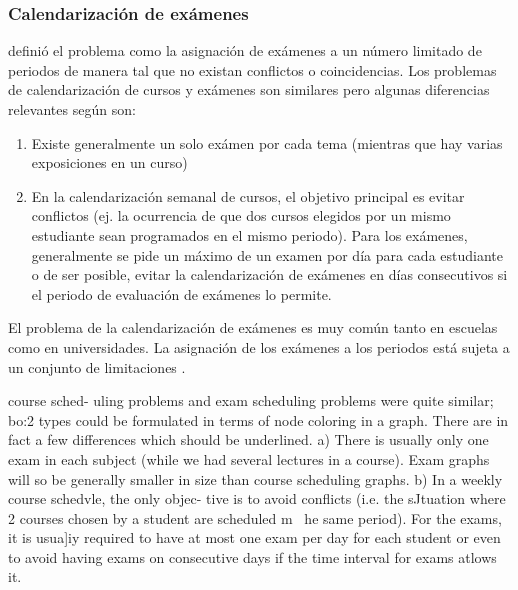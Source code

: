 \documentclass[draft,12pt,headsepline,footsepline,paper=letter]{scrreprt}
\begin{document}

\subsubsection{Calendarización de exámenes}

\citet[p.~4]{carter95recent-developments} definió el problema como la asignación de exámenes a un número limitado de periodos de manera tal que no existan conflictos o coincidencias. Los problemas de calendarización de cursos y exámenes son similares pero algunas diferencias relevantes según \citet[p.~159]{werra85an-introduction-to-timetabling} son:
\begin{enumerate}[a]
\item Existe generalmente un solo exámen por cada tema (mientras que hay varias exposiciones en un curso)
\item En la calendarización semanal de cursos, el objetivo principal es evitar conflictos (ej. la ocurrencia de que dos cursos elegidos por un mismo estudiante sean programados en el mismo periodo). Para los exámenes, generalmente se pide un máximo de un examen por día para cada estudiante o de ser posible, evitar la calendarización de exámenes en días consecutivos si el periodo de evaluación de exámenes lo permite.
\end{enumerate}
El problema de la calendarización de exámenes es muy común tanto en escuelas como en universidades. La asignación de los exámenes a los periodos está sujeta a un conjunto de limitaciones \citep[p.~12]{abdullah06heuristic-approaches}.

\iffalse
course sched- uling problems and exam scheduling problems were quite similar; bo:2 types could be formulated in terms of node coloring in a graph. There are in fact a few differences which should be underlined.
a) There is usually only one exam in each subject (while we had several lectures in a course). Exam graphs will so be generally smaller in size than course scheduling graphs.
b) In a weekly course schedvle, the only objec- tive is to avoid conflicts (i.e. the sJtuation where 2 courses chosen by a student are scheduled m ~he same period). For the exams, it is usua]iy required to have at most one exam per day for each student or even to avoid having exams on consecutive days if the time interval for exams atlows it.
\end{document}
